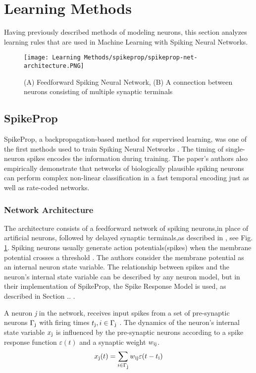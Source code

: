\documentclass[12pt]{report}
\begin{document}
\section{Learning Methods}
Having previously described methods of modeling neurons, this section analyzes learning rules that are used in Machine Learning with Spiking Neural Networks.
\begin{figure}[htp]
    \centering
    \texttt{[image: Learning Methods/spikeprop/spikeprop-net-architecture.PNG]}
    \caption{(A) Feedforward Spiking Neural Network, (B) A connection between neurons consisting of multiple synaptic terminals}
    \label{fig:spikeprop-net-architecture}
\end{figure}
\subsection{SpikeProp}
SpikeProp, a backpropagation-based method for supervised learning, was one of the first methods used to train Spiking Neural Networks \cite{bohte2002}. The timing of single-neuron spikes encodes the information during training. The paper's authors also empirically demonstrate that networks of biologically plausible spiking neurons can perform complex non-linear classification in a fast temporal encoding just as well as rate-coded networks.
\subsubsection{Network Architecture}
The architecture consists of a feedforward network of spiking neurons,in place of artificial neurons, followed by delayed synaptic terminals,as described in \cite{ruf1998}, see Fig. \ref{fig:spikeprop-net-architecture}. Spiking neurons usually generate action potentials(spikes) when the membrane potential crosses a threshold . The authors consider the membrane potential as an internal neuron state variable. The relationship between spikes and the neuron's internal state variable can be described by any neuron model, but in their implementation of SpikeProp, the Spike Response Model is used, as described in Section .. .

A neuron \textit{j} in the network, receives input spikes from a set of pre-synaptic neurons \(\Gamma\textsubscript{j}\) with firing times \(t\textsubscript{j},i\in\Gamma\textsubscript{j}\) . The dynamics of the neuron's internal state variable \(x\textsubscript{j}\) is influenced by the pre-synaptic neurons according to a spike response function \(\varepsilon(t)\) and a synaptic weight \(w\textsubscript{ij}\).
\begin{equation}
    x\textsubscript{j}(t) = \sum_{i\in\Gamma\textsubscript{j}} w\textsubscript{ij}\varepsilon(t-t\textsubscript{i})
\end{equation}
\end{document}
